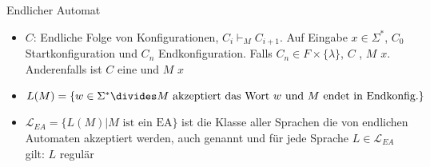 \begin{definition}[]{Endlicher Automat}
\begin{itemize}
        \item {} $C$: Endliche Folge von Konfigurationen, $C_i \vdash_M C_{i + 1}$.
              Auf Eingabe $x \in \Sigma^*$, $C_0$ Startkonfiguration und $C_n$ Endkonfiguration.
              Falls $C_n \in F \times \{ \lambda \}$, $C$ , $M$  $x$.
              Anderenfalls ist $C$ eine  und $M$  $x$
          \item {} $L(M) = \{ w \in \Sigma^* \divides \text{$M$ akzeptiert das Wort } w \text{ und $M$ endet in Endkonfig.} \}$
          \item $\mathcal{L}_{EA} = \{ L(M) | M \text{ ist ein EA}\}$ ist die Klasse aller Sprachen die von endlichen Automaten akzeptiert werden, auch genannt  und für jede Sprache $L \in \mathcal{L}_{EA}$ gilt: $L$ regulär
    \end{itemize}
\end{definition}

